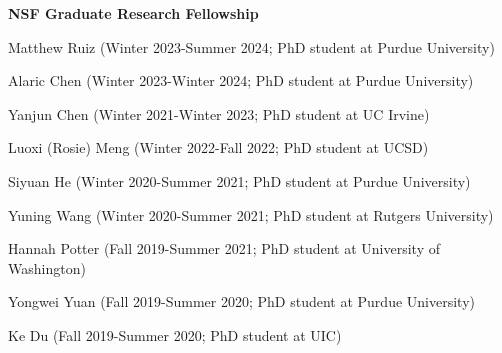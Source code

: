 \documentclass[10pt,letterpaper]{article}
\renewenvironment{itemize}{
  \begin{list}{}{
    \setlength{\leftmargin}{1.25em}
    \setlength{\itemsep}{0.25em}
    \setlength{\parskip}{0pt}
    \setlength{\parsep}{0.2em}
  }
}{
  \end{list}
}
\begin{document}
\begin{itemize}
\begin{enumerate}
            \begin{itemize}
              \item \textbf{NSF Graduate Research Fellowship}
            \end{itemize}
          \item Matthew Ruiz (Winter 2023-Summer 2024; PhD student at Purdue University)
          \item Alaric Chen (Winter 2023-Winter 2024; PhD student at Purdue University)
          \item Yanjun Chen (Winter 2021-Winter 2023; PhD student at UC Irvine)
          \item Luoxi (Rosie) Meng (Winter 2022-Fall 2022; PhD student at UCSD)
          \item Siyuan He (Winter 2020-Summer 2021; PhD student at Purdue University)
          \item Yuning Wang (Winter 2020-Summer 2021; PhD student at Rutgers University)
          \item Hannah Potter (Fall 2019-Summer 2021; PhD student at University of Washington)
          \item Yongwei Yuan (Fall 2019-Summer 2020; PhD student at Purdue University)
          \item Ke Du (Fall 2019-Summer 2020; PhD student at UIC)

\end{enumerate}
\end{itemize}
\end{document}
